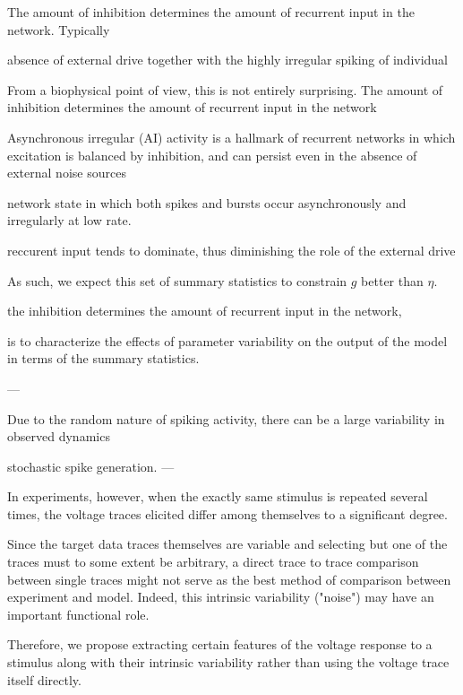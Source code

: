 The amount of inhibition determines the amount of recurrent input in the network. Typically

absence of external drive together with the highly irregular spiking of individual

From a biophysical point of view, this is not entirely surprising. The amount of inhibition determines the amount of recurrent input in the network 

Asynchronous irregular (AI) activity is a hallmark of recurrent networks in which excitation is balanced by inhibition, and can persist even in the absence of external noise sources

network state in which both spikes and bursts occur asynchronously and irregularly at low rate.

reccurent input tends to dominate, thus diminishing the role of the external drive

As such, we expect this set of summary statistics to constrain $g$ better than $\eta$.

the inhibition determines the amount of recurrent input in the network, 

is to characterize the effects of parameter variability on the output of the model in terms of the summary statistics.


---

Due to the random nature of spiking activity, there can be a large variability in observed dynamics

stochastic spike generation.
---

In experiments, however, when the exactly same stimulus is repeated several times, the voltage traces elicited differ among themselves to a significant degree. 

Since the target data traces themselves are variable and selecting but one of the traces must to some extent be arbitrary, a direct trace to trace comparison between single traces might not serve as the best method of comparison between experiment and model. Indeed, this intrinsic variability ("noise") may have an important functional role. 

Therefore, we propose extracting certain features of the voltage response to a stimulus along with their intrinsic variability rather than using the voltage trace itself directly. 